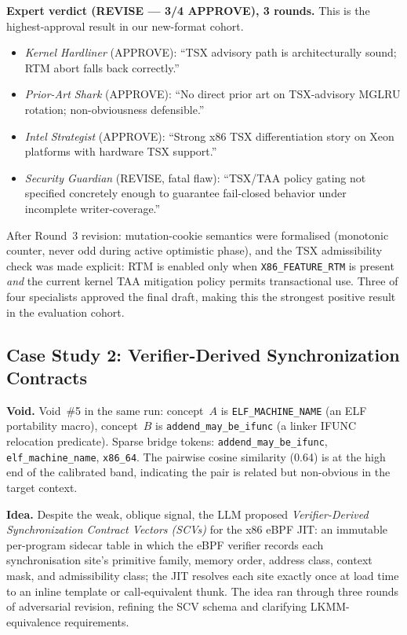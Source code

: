 \documentclass[11pt,twocolumn]{article}
\begin{document}
\textbf{Expert verdict (REVISE --- \textbf{3/4 APPROVE}), 3 rounds.}
This is the highest-approval result in our new-format cohort.
\begin{itemize}[noitemsep,topsep=2pt]
  \item \textit{Kernel Hardliner} (APPROVE): ``TSX advisory path
    is architecturally sound; RTM abort falls back correctly.''
  \item \textit{Prior-Art Shark} (APPROVE): ``No direct prior art on
    TSX-advisory MGLRU rotation; non-obviousness defensible.''
  \item \textit{Intel Strategist} (APPROVE): ``Strong x86 TSX
    differentiation story on Xeon platforms with hardware TSX support.''
  \item \textit{Security Guardian} (REVISE, fatal flaw): ``TSX/TAA
    policy gating not specified concretely enough to guarantee
    fail-closed behavior under incomplete writer-coverage.''
\end{itemize}
After Round~3 revision: mutation-cookie semantics were formalised
(monotonic counter, never odd during active optimistic phase), and
the TSX admissibility check was made explicit: RTM is enabled only
when \texttt{X86\_FEATURE\_RTM} is present \emph{and} the current
kernel TAA mitigation policy permits transactional use.
Three of four specialists approved the final draft, making this
the strongest positive result in the evaluation cohort.

\subsection{Case Study 2: Verifier-Derived Synchronization Contracts}

\textbf{Void.}  Void~\#5 in the same run: concept~$A$ is
\texttt{ELF\_MACHINE\_NAME} (an ELF portability macro), concept~$B$ is
\texttt{addend\_may\_be\_ifunc} (a linker IFUNC relocation predicate).
Sparse bridge tokens: \texttt{addend\_may\_be\_ifunc},
\texttt{elf\_machine\_name}, \texttt{x86\_64}.  The pairwise cosine
similarity (0.64) is at the high end of the calibrated band, indicating
the pair is related but non-obvious in the target context.

\textbf{Idea.}  Despite the weak, oblique signal, the LLM proposed
\emph{Verifier-Derived Synchronization Contract Vectors (SCVs)} for the
x86 eBPF JIT: an immutable per-program sidecar table in which the eBPF
verifier records each synchronisation site's primitive family, memory
order, address class, context mask, and admissibility class; the JIT
resolves each site exactly once at load time to an inline template or
call-equivalent thunk.  The idea ran through three rounds of
adversarial revision, refining the SCV schema and clarifying
LKMM-equivalence requirements.
\end{document}
